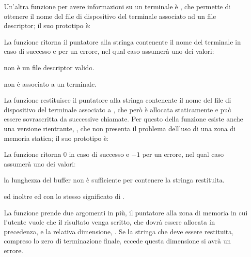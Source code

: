 Un'altra funzione per avere informazioni su un terminale è ,
che permette di ottenere il nome del file di dispositivo del terminale
associato ad un file descriptor; il suo prototipo è:

\begin{funcproto}{
}

{La funzione ritorna il puntatore alla stringa contenente il nome del
  terminale in caso di successo e  per un errore, nel qual caso
   assumerà uno dei valori:
  \begin{errlist}
  \item[\errcode{EBADF}]  non è un file descriptor valido.
  \item[\errcode{ENOTTY}]  non è associato a un terminale.
  \end{errlist}
}
\end{funcproto}

La funzione restituisce il puntatore alla stringa contenente il nome del file
di dispositivo del terminale associato a , che però è allocata
staticamente e può essere sovrascritta da successive chiamate. Per questo
della funzione esiste anche una versione rientrante, , che
non presenta il problema dell'uso di una zona di memoria statica; il suo
prototipo è:

\begin{funcproto}{
}

{La funzione ritorna $0$ in caso di successo e $-1$ per un errore, nel qual
  caso  assumerà uno dei valori: 
  \begin{errlist}
    \item[\errcode{ERANGE}] la lunghezza del buffer  non è
      sufficiente per contenere la stringa restituita.
  \end{errlist}
  ed inoltre  ed  con lo stesso significato di
  .}
\end{funcproto}

La funzione prende due argomenti in più, il puntatore  alla zona
di memoria in cui l'utente vuole che il risultato venga scritto, che dovrà
essere allocata in precedenza, e la relativa dimensione, . Se la
stringa che deve essere restituita, compreso lo zero di terminazione finale,
eccede questa dimensione si avrà un errore.

